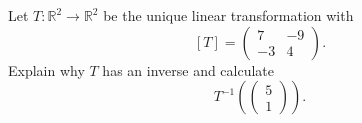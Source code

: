 \documentclass[12pt]{article}
\newenvironment{problem}[2][Problem]
{
	\begin{trivlist} 
		\item[\hskip \labelsep {\bfseries #1 #2:}]
	}
{
	\end{trivlist}
	}
\newenvironment{solution}[1][Solution]
{
	\begin{trivlist} 
		\item[\hskip \labelsep {\itshape #1:}]
	}
	{
	\end{trivlist}
}
\begin{document}
\newpage
\begin{problem}{3}
Let $T:\mathbb{R}^2 \to \mathbb{R}^2$ be the unique linear transformation with
\[
[T]=\begin{pmatrix}7 &-9\\-3 & 4 \end{pmatrix}\text{.}
\]
Explain why $T$ has an inverse and calculate
\[
T^{-1}\left(\begin{pmatrix}5\\1 \end{pmatrix} \right) \text{.}
\]
%
%
\noindent
\newline
\newline


\end{problem}
\end{document}
